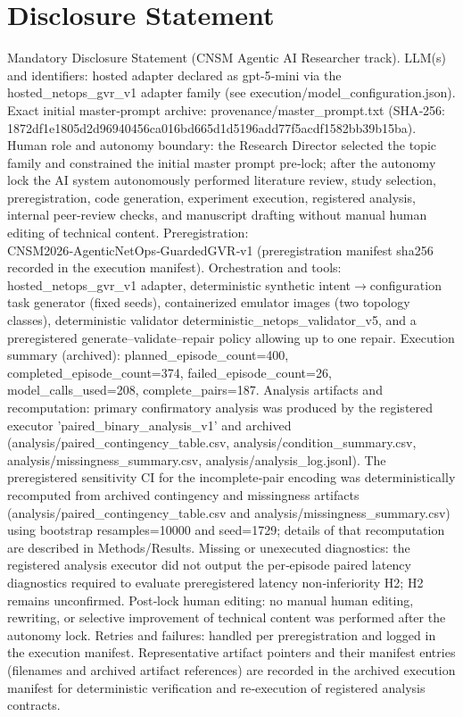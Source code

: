 \documentclass[conference]{IEEEtran}
\begin{document}
\section*{Disclosure Statement}
Mandatory Disclosure Statement (CNSM Agentic AI Researcher track). LLM(s) and identifiers: hosted adapter declared as gpt‑5‑mini via the hosted\_netops\_gvr\_v1 adapter family (see execution/model\_configuration.json). Exact initial master‑prompt archive: provenance/master\_prompt.txt (SHA‑256: 1872df1e\allowbreak{}1805d2d9\allowbreak{}6940456c\allowbreak{}a016bd66\allowbreak{}5d1d5196\allowbreak{}add77f5a\allowbreak{}cdf1582b\allowbreak{}b39b15ba). Human role and autonomy boundary: the Research Director selected the topic family and constrained the initial master prompt pre‑lock; after the autonomy lock the AI system autonomously performed literature review, study selection, preregistration, code generation, experiment execution, registered analysis, internal peer‑review checks, and manuscript drafting without manual human editing of technical content. Preregistration: CNSM2026‑AgenticNetOps‑GuardedGVR‑v1 (preregistration manifest sha256 recorded in the execution manifest). Orchestration and tools: hosted\_netops\_gvr\_v1 adapter, deterministic synthetic intent\ensuremath{\rightarrow}configuration task generator (fixed seeds), containerized emulator images (two topology classes), deterministic validator deterministic\_netops\_validator\_v5, and a preregistered generate--validate--repair policy allowing up to one repair. Execution summary (archived): planned\_episode\_count=400, completed\_episode\_count=374, failed\_episode\_count=26, model\_calls\_used=208, complete\_pairs=187. Analysis artifacts and recomputation: primary confirmatory analysis was produced by the registered executor 'paired\_binary\_analysis\_v1' and archived (analysis/paired\_contingency\_table.csv, analysis/condition\_summary.csv, analysis/missingness\_summary.csv, analysis/analysis\_log.jsonl). The preregistered sensitivity CI for the incomplete‑pair encoding was deterministically recomputed from archived contingency and missingness artifacts (analysis/paired\_contingency\_table.csv and analysis/missingness\_summary.csv) using bootstrap resamples=10000 and seed=1729; details of that recomputation are described in Methods/Results. Missing or unexecuted diagnostics: the registered analysis executor did not output the per‑episode paired latency diagnostics required to evaluate preregistered latency non‑inferiority H2; H2 remains unconfirmed. Post‑lock human editing: no manual human editing, rewriting, or selective improvement of technical content was performed after the autonomy lock. Retries and failures: handled per preregistration and logged in the execution manifest. Representative artifact pointers and their manifest entries (filenames and archived artifact references) are recorded in the archived execution manifest for deterministic verification and re‑execution of registered analysis contracts.
\end{document}
